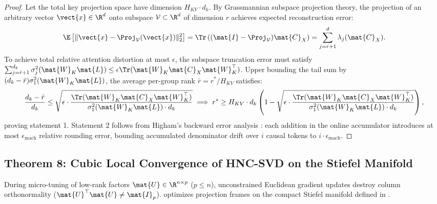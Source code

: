 \begin{proof}
Let the total key projection space have dimension $H_{KV} \cdot d_k$. By Grassmannian subspace projection theory, the projection of an arbitrary vector $\vect{x} \in \R^d$ onto subspace $\mathcal{V} \subset \R^d$ of dimension $r$ achieves expected reconstruction error:
\begin{equation}
\E\left[ \| \vect{x} - \Proj_{\mathcal{V}}(\vect{x}) \|_2^2 \right] = \Tr\left( (\mat{I} - \Proj_{\mathcal{V}}) \mat{C}_X \right) = \sum_{j=r+1}^d \lambda_j(\mat{C}_X).
\end{equation}
To achieve total relative attention distortion at most $\epsilon$, the subspace truncation error must satisfy $\sum_{j=\bar{r}+1}^{d_k} \sigma_j^2(\mat{W}_K \mat{L}) \le \epsilon \Tr(\mat{W}_K \mat{C}_X \mat{W}_K^\top)$. Upper bounding the tail sum by $(d_k - \bar{r}) \sigma_1^2(\mat{W}_K \mat{L})$, the average per-group rank $\bar{r} = r^* / H_{KV}$ satisfies:
\begin{equation}
\frac{d_k - \bar{r}}{d_k} \le \sqrt{\epsilon \cdot \frac{\Tr(\mat{W}_K \mat{C}_X \mat{W}_K^\top)}{\sigma_1^2(\mat{W}_K \mat{L}) \cdot d_k}} \implies r^* \ge H_{KV} \cdot d_k \left( 1 - \sqrt{\epsilon \cdot \frac{\Tr(\mat{W}_K \mat{C}_X \mat{W}_K^\top)}{\sigma_1^2(\mat{W}_K \mat{L}) \cdot d_k}} \right),
\end{equation}
proving statement 1. Statement 2 follows from Higham's backward error analysis \cite{higham2002accuracy}: each addition in the online accumulator introduces at most $\epsilon_{\text{mach}}$ relative rounding error, bounding accumulated denominator drift over $i$ causal tokens to $i \cdot \epsilon_{\text{mach}}$.
\end{proof}

\subsection{Theorem 8: Cubic Local Convergence of HNC-SVD on the Stiefel Manifold}
\label{sec:thm_hnc_svd}

During micro-tuning of low-rank factors $\mat{U} \in \R^{n \times p}$ ($p \le n$), unconstrained Euclidean gradient updates destroy column orthonormality ($\mat{U}^\top \mat{U} \neq \mat{I}_p$). \neuralops{} optimizes projection frames on the compact Stiefel manifold defined in .

